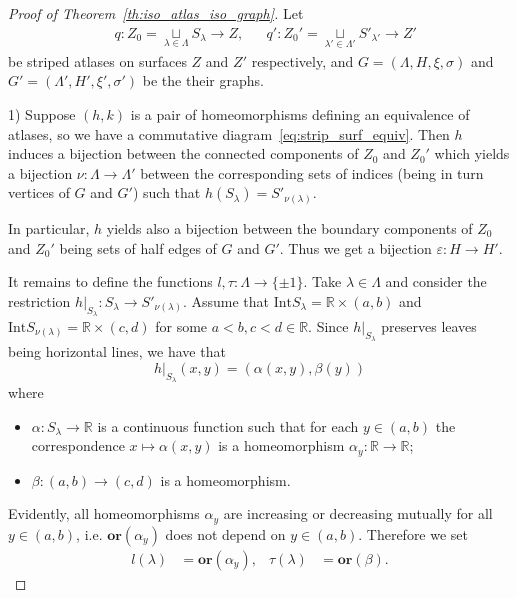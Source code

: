 \documentclass[12pt, reqno]{amsart}
\newcommand{\bR}{\mathbb{R}}
\newcommand{\Int}{\mathrm{Int}}
\newcommand\dif{h}
\newcommand{\strip}{S}
\newcommand{\stripSurf}{Z}
\newcommand{\preStripSurf}{\stripSurf_0}
\newcommand{\stInd}{{\lambda}}
\newcommand{\StInd}{\Lambda}
\newcommand{\qmap}{q}
\newcommand\Gr{G}
\newcommand\ori{\mathbf{or}}
\newcommand\lori{l}
\newcommand\tori{\tau}
\newcommand\eiso{\varepsilon}
\newcommand\viso{\nu}
\newcommand\mZZ{\{\pm1\}}
\begin{document}
\begin{proof}[Proof of Theorem~\ref{th:iso_atlas_iso_graph}]
Let 
\begin{align*}
&\qmap: \preStripSurf= \mathop{\sqcup}\limits_{\stInd\in\StInd}\strip_{\stInd} \to \stripSurf, &
&\qmap':\preStripSurf' = \mathop{\sqcup}\limits_{\stInd'\in\StInd'}\strip'_{\stInd'} \to \stripSurf'
\end{align*}
be striped atlases on surfaces $\stripSurf$ and $\stripSurf'$ respectively, and $\Gr=(\StInd, H, \xi, \sigma)$ and $\Gr'=(\StInd', H', \xi', \sigma')$ be the their graphs.


1) Suppose $(\dif,k)$ is a pair of homeomorphisms defining an equivalence of atlases, so we have a commutative diagram~\eqref{eq:strip_surf_equiv}.
Then $\dif$ induces a bijection between the connected components of $\preStripSurf$ and $\preStripSurf'$ which yields a bijection $\viso:\Lambda \to \Lambda'$ between the corresponding sets of indices (being in turn vertices of $\Gr$ and $\Gr'$) such that $\dif(\strip_{\stInd}) = \strip'_{\viso(\stInd)}$.

In particular, $\dif$ yields also a bijection between the boundary components of $\preStripSurf$ and $\preStripSurf'$ being sets of half edges of $\Gr$ and $\Gr'$.
Thus we get a bijection $\eiso:H \to H'$.

It remains to define the functions $\lori,\tori:\StInd\to\mZZ$.
Take $\stInd\in\StInd$ and consider the restriction 
$\dif|_{\strip_{\stInd}}:\strip_{\stInd}\to \strip'_{\viso(\stInd)}$.
Assume that $\Int\strip_{\stInd}=\bR\times(a,b)$ and $\Int\strip_{\viso(\stInd)}=\bR\times(c,d)$ for some $a<b, c<d\in\bR$.
Since $\dif|_{\strip_{\stInd}}$ preserves leaves being horizontal lines, we have that
\[\dif|_{\strip_{\stInd}}(x,y) = (\alpha(x,y), \beta(y))\]
where 
\begin{itemize}[leftmargin=4ex]
\item 
$\alpha:\strip_{\stInd} \to \bR$ is a continuous function such that for each $y\in(a,b)$ the correspondence $x \mapsto \alpha(x,y)$ is a homeomorphism $\alpha_y: \bR\to\bR$;
\item 
$\beta:(a,b) \to (c,d)$ is a homeomorphism.
\end{itemize}
Evidently, all homeomorphisms $\alpha_{y}$ are increasing or decreasing mutually for all $y\in(a,b)$, i.e. $\ori(\alpha_{y})$ does not depend on $y\in(a,b)$.
Therefore we set
\begin{align*}
\lori(\stInd) &= \ori(\alpha_y), &
\tori(\stInd) &= \ori(\beta).
\end{align*}




\end{proof}
\end{document}
